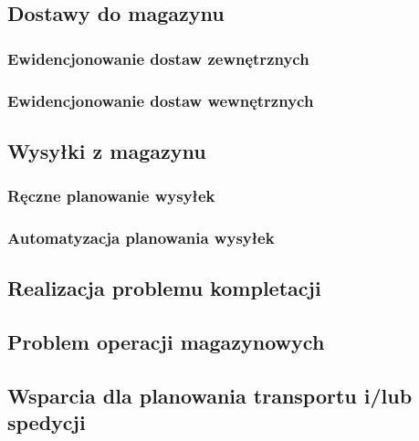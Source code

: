 	\subsection{Dostawy do magazynu}
		\subsubsection{Ewidencjonowanie dostaw zewnętrznych}
		\subsubsection{Ewidencjonowanie dostaw wewnętrznych}
	\subsection{Wysyłki z magazynu}
		\subsubsection{Ręczne planowanie wysyłek}
		\subsubsection{Automatyzacja planowania wysyłek}
	\subsection{Realizacja problemu kompletacji}
	\subsection{Problem operacji magazynowych}
	\subsection{Wsparcia dla planowania transportu i/lub spedycji}
